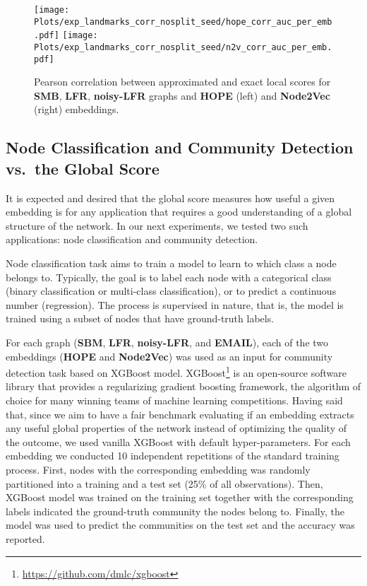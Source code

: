 \documentclass[11pt]{article}
\begin{document}
\begin{figure}[htb]
    \centering
    \texttt{[image: Plots/exp\_landmarks\_corr\_nosplit\_seed/hope\_corr\_auc\_per\_emb.pdf]}
        \hspace{.1cm}
    \texttt{[image: Plots/exp\_landmarks\_corr\_nosplit\_seed/n2v\_corr\_auc\_per\_emb.pdf]}
     \caption{Pearson correlation between approximated and exact local scores for \textbf{SMB}, \textbf{LFR}, \textbf{noisy-LFR}  graphs and \textbf{HOPE} (left) and \textbf{Node2Vec} (right) embeddings.}
    \label{fig:10kratioapprox_exact_aucseed}
\end{figure}

\subsection{Node Classification and Community Detection vs.\ the Global Score}\label{sec:correlation_with_global_score}

It is expected and desired that the global score measures how useful a given embedding is for any application that requires a good understanding of a global structure of the network. In our next experiments, we tested two such applications: node classification and community detection. 

\medskip

Node classification task aims to train a model to learn to which class a node belongs to. Typically, the goal is to label each node with a categorical class (binary classification or multi-class classification), or to predict a continuous number (regression). The process is supervised in nature, that is, the model is trained using a subset of nodes that have ground-truth labels.

For each graph (\textbf{SBM}, \textbf{LFR}, \textbf{noisy-LFR}, and \textbf{EMAIL}), each of the two embeddings (\textbf{HOPE} and \textbf{Node2Vec}) was used as an input for community detection task based on XGBoost model. XGBoost\footnote{\url{https://github.com/dmlc/xgboost}} is an open-source software library that provides a regularizing gradient boosting framework, the algorithm of choice for many winning teams of machine learning competitions. Having said that, since we aim to have a fair benchmark evaluating if an embedding extracts any useful global properties of the network instead of optimizing the quality of the outcome, we used vanilla XGBoost with default hyper-parameters. For each embedding we conducted 10 independent repetitions of the standard training process. First, nodes with the corresponding embedding was randomly partitioned into a training and a test set (25\% of all observations). Then, XGBoost model was trained on the training set together with the corresponding labels indicated the ground-truth community the nodes belong to. Finally, the model was used to predict the communities on the test set and the accuracy was reported. 
\end{document}

